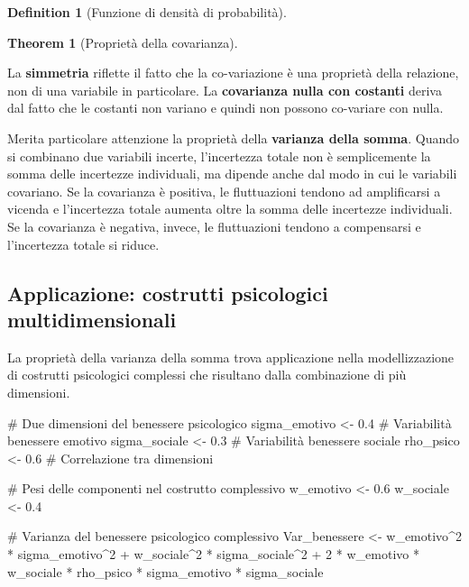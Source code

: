 \documentclass[
  letterpaper,
  DIV=11,
  numbers=noendperiod,
  oneside]{scrreprt}
\newenvironment{Shaded}{\begin{snugshade}}{\end{snugshade}}
\newcommand{\CommentTok}[1]{\textcolor[rgb]{0.37,0.37,0.37}{#1}}
\newcommand{\DecValTok}[1]{\textcolor[rgb]{0.68,0.00,0.00}{#1}}
\newcommand{\FloatTok}[1]{\textcolor[rgb]{0.68,0.00,0.00}{#1}}
\newcommand{\NormalTok}[1]{\textcolor[rgb]{0.00,0.23,0.31}{#1}}
\newcommand{\OtherTok}[1]{\textcolor[rgb]{0.00,0.23,0.31}{#1}}
\newcommand{\SpecialCharTok}[1]{\textcolor[rgb]{0.37,0.37,0.37}{#1}}
\theoremstyle{definition}
\theoremstyle{plain}
\newtheorem{theorem}{Theorem}[chapter]
\theoremstyle{definition}
\newtheorem{definition}{Definition}[chapter]
\theoremstyle{remark}
\begin{document}
\begin{definition}[Funzione di densità di
probabilità]
\begin{theorem}[Proprietà della
covarianza]
\end{theorem}

La \textbf{simmetria} riflette il fatto che la co-variazione è una
proprietà della relazione, non di una variabile in particolare. La
\textbf{covarianza nulla con costanti} deriva dal fatto che le costanti
non variano e quindi non possono co-variare con nulla.

Merita particolare attenzione la proprietà della \textbf{varianza della
somma}. Quando si combinano due variabili incerte, l'incertezza totale
non è semplicemente la somma delle incertezze individuali, ma dipende
anche dal modo in cui le variabili covariano. Se la covarianza è
positiva, le fluttuazioni tendono ad amplificarsi a vicenda e
l'incertezza totale aumenta oltre la somma delle incertezze individuali.
Se la covarianza è negativa, invece, le fluttuazioni tendono a
compensarsi e l'incertezza totale si riduce.

\subsection{Applicazione: costrutti psicologici
multidimensionali}\label{applicazione-costrutti-psicologici-multidimensionali}

La proprietà della varianza della somma trova applicazione nella
modellizzazione di costrutti psicologici complessi che risultano dalla
combinazione di più dimensioni.

\begin{Shaded}
\begin{Highlighting}[]
\CommentTok{\# Due dimensioni del benessere psicologico}
\NormalTok{sigma\_emotivo }\OtherTok{\textless{}{-}} \FloatTok{0.4}  \CommentTok{\# Variabilità benessere emotivo}
\NormalTok{sigma\_sociale }\OtherTok{\textless{}{-}} \FloatTok{0.3}  \CommentTok{\# Variabilità benessere sociale}
\NormalTok{rho\_psico }\OtherTok{\textless{}{-}} \FloatTok{0.6}      \CommentTok{\# Correlazione tra dimensioni}

\CommentTok{\# Pesi delle componenti nel costrutto complessivo}
\NormalTok{w\_emotivo }\OtherTok{\textless{}{-}} \FloatTok{0.6}
\NormalTok{w\_sociale }\OtherTok{\textless{}{-}} \FloatTok{0.4}

\CommentTok{\# Varianza del benessere psicologico complessivo}
\NormalTok{Var\_benessere }\OtherTok{\textless{}{-}}\NormalTok{ w\_emotivo}\SpecialCharTok{\^{}}\DecValTok{2} \SpecialCharTok{*}\NormalTok{ sigma\_emotivo}\SpecialCharTok{\^{}}\DecValTok{2} \SpecialCharTok{+} 
\NormalTok{                 w\_sociale}\SpecialCharTok{\^{}}\DecValTok{2} \SpecialCharTok{*}\NormalTok{ sigma\_sociale}\SpecialCharTok{\^{}}\DecValTok{2} \SpecialCharTok{+} 
                 \DecValTok{2} \SpecialCharTok{*}\NormalTok{ w\_emotivo }\SpecialCharTok{*}\NormalTok{ w\_sociale }\SpecialCharTok{*}\NormalTok{ rho\_psico }\SpecialCharTok{*}\NormalTok{ sigma\_emotivo }\SpecialCharTok{*}\NormalTok{ sigma\_sociale}


\end{Highlighting}
\end{Shaded}
\end{definition}
\end{document}
